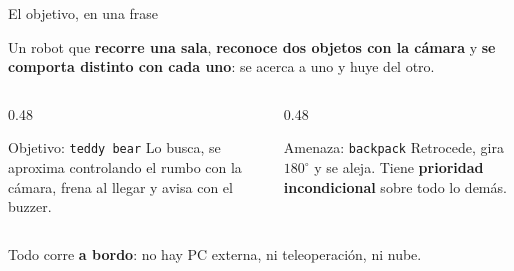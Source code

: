 \documentclass[aspectratio=169,10pt]{beamer}
\begin{document}
\begin{frame}{El objetivo, en una frase}
  \begin{alertblock}{}
    \centering\large
    Un robot que \textbf{recorre una sala}, \textbf{reconoce dos objetos con la
    cámara} y \textbf{se comporta distinto con cada uno}: se acerca a uno y huye
    del otro.
  \end{alertblock}

  \vspace{0.8em}
  \begin{columns}[T]
    \begin{column}{0.48\textwidth}
      \begin{block}{Objetivo: \texttt{teddy bear}}
        Lo busca, se aproxima controlando el rumbo con la cámara, frena al
        llegar y avisa con el buzzer.
      \end{block}
    \end{column}
    \begin{column}{0.48\textwidth}
      \begin{block}{Amenaza: \texttt{backpack}}
        Retrocede, gira $180^\circ$ y se aleja. Tiene \textbf{prioridad
        incondicional} sobre todo lo demás.
      \end{block}
    \end{column}
  \end{columns}

  \vspace{0.8em}
  \small
  Todo corre \textbf{a bordo}: no hay PC externa, ni teleoperación, ni nube.
\end{frame}
\end{document}
